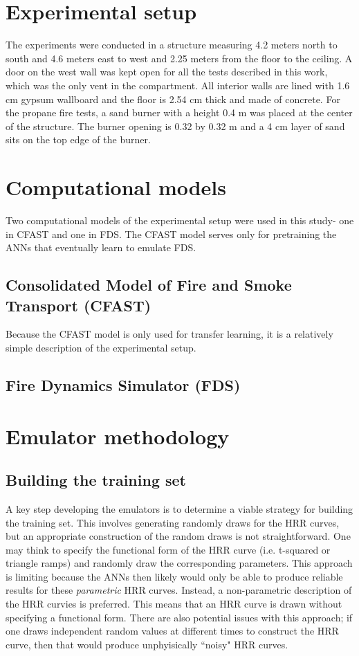 \documentclass{article}
\begin{document}
\section{Experimental setup}
The experiments were conducted in a structure measuring 4.2 meters north to south and 4.6 meters east to west and 2.25 meters from the floor to the ceiling. A door on the west wall was kept open for all the tests described in this work, which was the only vent in the compartment. All interior walls are lined with 1.6 cm gypsum wallboard and the floor is 2.54 cm thick and made of concrete. For the propane fire tests, a sand burner with a height 0.4 m was placed at the center of the structure. The burner opening is 0.32 by 0.32 m and a 4 cm layer of sand sits on the top edge of the burner. 

\section{Computational models}
Two computational models of the experimental setup were used in this study- one in CFAST and one in FDS. The CFAST model serves only for pretraining the ANNs that eventually learn to emulate FDS. 
\subsection{Consolidated Model of Fire and Smoke Transport (CFAST)}
Because the CFAST model is only used for transfer learning, it is a relatively simple description of the experimental setup. 


\subsection{Fire Dynamics Simulator (FDS)}




\section{Emulator methodology}
\subsection{Building the training set}
A key step developing the emulators is to determine a viable strategy for building the training set. This involves generating randomly draws for the HRR curves, but an appropriate construction of the random draws is not straightforward. One may think to specify the functional form of the HRR curve (i.e. t-squared or triangle ramps) and randomly draw the corresponding parameters. This approach is limiting because the ANNs then likely would only be able to produce reliable results for these \textit{parametric} HRR curves. Instead, a non-parametric description of the HRR curvies is preferred. This means that an HRR curve is drawn without specifying a functional form. There are also potential issues with this approach; if one draws independent random values at different times to construct the HRR curve, then that would produce unphyisically ``noisy" HRR curves.
\end{document}
